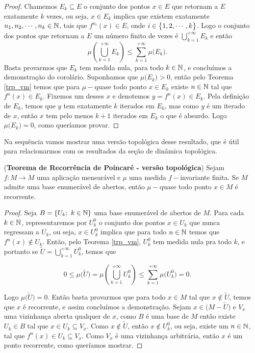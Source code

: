 \begin{proof} Chamemos $E_k\subseteq E$ o conjunto dos pontos $x\in E$ que retornam a $E$ exatamente $k$ vezes, ou seja, $x\in E_k$ implica que existem exatamente $n_1,n_2,\cdots,n_k\in\mathbb{N}$, tais que $f^{n_i}(x)\in E$, onde $i\in\big\{1,2,\cdots,k\big\}$. Logo o conjunto dos pontos que retornam a $E$ um número finito de vezes é $\bigcup_{k=1}^{+\infty}E_k$ e então
$$\mu\left(\bigcup_{k=1}^{+\infty}E_k\right)\leq\sum_{k=1}^{+\infty}\mu\big(E_k\big) .$$\vspace{0.2cm}
Basta provarmos que $E_k$ tem medida nula, para todo $k\in\mathbb{N}$, e concluímos a demonstração do corolário. Suponhamos que $\mu\big(E_k\big)>0$, então pelo Teorema \ref{trp_vm} temos que para $\mu-$quase todo ponto $x\in E_k$ existe $n\in \mathbb{N}$ tal que $f^n(x)\in E_k$. Fixemos um desses $x$ e denotemos $y=f^n(x)\in E_k$. Pela definição de $E_k$, temos que $y$ tem exatamente $k$ iterados em $E_k$, mas como $y$ é um iterado de $x$, então $x$ tem pelo menos $k+1$ iterados em $E_k$ o que é absurdo. Logo $\mu\big(E_k\big)=0$, como queríamos provar.
\end{proof}

Na sequência vamos mostrar uma versão topológica desse resultado, que é útil para relacionarmos com os resultados da seção de dinâmica topológica.

\begin{teorema}\label{trp_vt} (\textbf{Teorema de Recorrência de Poincaré - versão topológica}) Sejam $f:M \to M$ uma aplicação mensurável e $\mu$ uma medida $f-$invariante finita. Se $M$ admite uma base enumerável de abertos, então $\mu-$quase todo ponto $x\in M$ é recorrente.
\end{teorema}

\begin{proof}
Seja $B=\{U_k;\ k\in\N\}$ uma base enumerável de abertos de $M$. Para cada $k\in\mathbb{N}$, representaremos por $U_{k}^{0}$ o conjunto dos pontos $x\in U_k$ que nunca regressam a $U_k$, ou seja, $x\in U_{k}^{0}$ implica que para todo $n\in\mathbb{N}$ temos que $f^n(x)\notin U_k$. Então, pelo Teorema \ref{trp_vm}, $U_{k}^{0}$ tem medida nula pra todo $k$, e portanto se $\tilde{U}=\bigcup_{k=1}^{+\infty}{U_{k}^{0}}$, temos que

\begin{equation*}
0\leq\mu\big(\tilde{U}\big)=\mu\left(\bigcup_{k=1}^{+\infty}{U_{k}^{0}}\right)\leq\sum_{k=1}^{+\infty}\mu\big(U_{k}^{0}\big)=0.
\end{equation*}\vspace{0.1cm}

Logo $\mu\big(\tilde{U}\big)=0$. Então basta provarmos que para todo $x\in M$ tal que $x\notin \tilde{U}$, temos que $x$ é recorrente, e assim concluímos a demonstração. Sejam $x\in\big(M-\tilde{U}\big)$ e $V_x$ uma vizinhança aberta qualquer de $x$, como $B$ é uma base de $M$ então existe $U_k\in B$ tal que $x\in U_k\subseteq V_x$. Como $x\notin \tilde{U}$, então $x\notin U_{k}^{0}$, ou seja, existe um $n\in\mathbb{N}$, tal que $f^n(x)\in U_k\subseteq V_x$. Como $V_x$ é uma vizinhança arbitrária, então $x$ é um ponto recorrente, como queríamos mostrar.
\end{proof}

